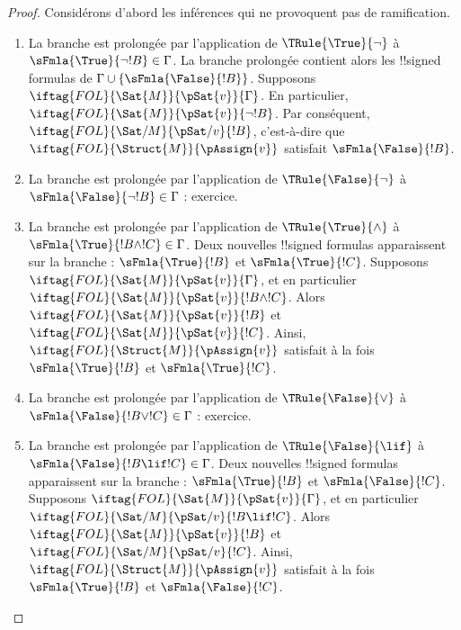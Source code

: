 \documentclass[11pt,a4paper,openany]{memoir}
\begin{document}
\begin{proof}
Considérons d'abord les inférences qui ne provoquent pas de ramification.
\begin{enumerate}
\item La branche est prolongée par l'application de
  $\TRule{\True}{\lnot}$ à
  $\sFmla{\True}{\lnot !B} \in \Gamma$. La branche prolongée contient
  alors les !!{signed formula}s de
  $\Gamma \cup \{\sFmla{\False}{!B}\}$. Supposons
  $\iftag{FOL}{\Sat{M}}{\pSat{v}}{\Gamma}$. En particulier,
  $\iftag{FOL}{\Sat{M}}{\pSat{v}}{\lnot !B}$. Par conséquent,
  $\iftag{FOL}{\Sat/{M}}{\pSat/{v}}{!B}$, c'est-à-dire que
  $\iftag{FOL}{\Struct{M}}{\pAssign{v}}$ satisfait
  $\sFmla{\False}{!B}$.
\item La branche est prolongée par l'application de
  $\TRule{\False}{\lnot}$ à
  $\sFmla{\False}{\lnot !B} \in \Gamma$ : exercice.
\item La branche est prolongée par l'application de
  $\TRule{\True}{\land}$ à
  $\sFmla{\True}{!B \land !C} \in \Gamma$. Deux nouvelles
  !!{signed formula}s apparaissent sur la branche :
  $\sFmla{\True}{!B}$ et $\sFmla{\True}{!C}$. Supposons
  $\iftag{FOL}{\Sat{M}}{\pSat{v}}{\Gamma}$, et en particulier
  $\iftag{FOL}{\Sat{M}}{\pSat{v}}{!B \land !C}$. Alors
  $\iftag{FOL}{\Sat{M}}{\pSat{v}}{!B}$ et
  $\iftag{FOL}{\Sat{M}}{\pSat{v}}{!C}$. Ainsi,
  $\iftag{FOL}{\Struct{M}}{\pAssign{v}}$ satisfait à la fois
  $\sFmla{\True}{!B}$ et $\sFmla{\True}{!C}$.
\item La branche est prolongée par l'application de
  $\TRule{\False}{\lor}$ à
  $\sFmla{\False}{!B \lor !C} \in \Gamma$ : exercice.
\item La branche est prolongée par l'application de
  $\TRule{\False}{\lif}$ à
  $\sFmla{\False}{!B \lif !C} \in \Gamma$. Deux nouvelles
  !!{signed formula}s apparaissent sur la branche :
  $\sFmla{\True}{!B}$ et $\sFmla{\False}{!C}$. Supposons
  $\iftag{FOL}{\Sat{M}}{\pSat{v}}{\Gamma}$, et en particulier
  $\iftag{FOL}{\Sat/{M}}{\pSat/{v}}{!B \lif !C}$. Alors
  $\iftag{FOL}{\Sat{M}}{\pSat{v}}{!B}$ et
  $\iftag{FOL}{\Sat/{M}}{\pSat/{v}}{!C}$. Ainsi,
  $\iftag{FOL}{\Struct{M}}{\pAssign{v}}$ satisfait à la fois
  $\sFmla{\True}{!B}$ et $\sFmla{\False}{!C}$.

\end{enumerate}
\end{proof}
\end{document}
